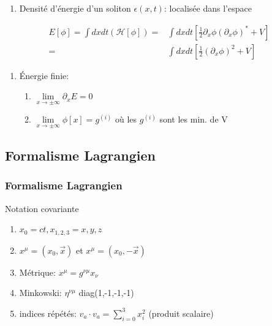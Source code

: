 \documentclass[handout]{beamer}
\begin{document}
\begin{frame}
	\begin{enumerate}
	\item Densité d'énergie d'un soliton $\epsilon(x,t)$: localisée dans l'espace

	\end{enumerate}
		\begin{align*}
	E[\phi] = \int{dxdt (\mathcal{H}[\phi])} =& \int{dxdt [\frac{1}{2} \partial_x \phi (\partial_x \phi)^* +V]} \\
	=& \int{dxdt [\frac{1}{2} (\partial_x \phi)^2 + V]}
	\end{align*}
	
	\begin{enumerate}

	\item Énergie finie:
	\begin{enumerate}
	\item  $\lim\limits_{x \to \pm\infty}\partial_x E =0$
	\item  $\lim\limits_{x \to \pm\infty} \phi[x] = g^{(i)}$ où les $g^{(i)}$ sont les min. de V	
	\end{enumerate}	
	\end{enumerate} 
\end{frame}


\subsection{Formalisme Lagrangien}
\begin{frame}

\frametitle{Formalisme Lagrangien}

\begin{block}{Notation covariante}

\begin{enumerate}
\item $x_0 = ct, x_{1,2,3} = x,y,z$
\item $x^\mu = (x_0,\vec{x})$ et $x^\mu = (x_0,-\vec{x})$
\item Métrique: $x^\mu = g^{\nu\mu} x_\nu$
\item Minkowski: $\eta^{\nu\mu}$ diag(1,-1,-1,-1)
\item indices répétés: $v_a \cdot v_a = \sum_{i=0}^{3}x_i^2$ (produit scalaire)
\end{enumerate}

\end{block}
\end{frame}
\end{document}
